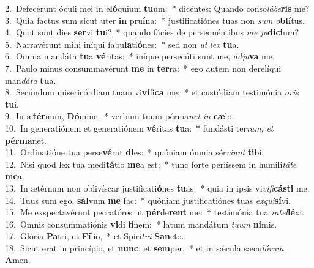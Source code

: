 {2.~}Defecérunt óculi mei in e\textbf{ló}quium \textbf{tu}um:~* dicéntes: Quando conso\textit{lá}\textit{be}\textbf{ris} me?\\
{3.~}Quia factus sum sicut uter \textbf{in} pru\textbf{í}na:~* justificatiónes tuas non \textit{sum} \textit{o}\textbf{blí}tus.\\
{4.~}Quot sunt dies \textbf{ser}vi \textbf{tu}i?~* quando fácies de persequéntibus \textit{me} \textit{ju}\textbf{dí}\textbf{ci}um?\\
{5.~}Narravérunt mihi iníqui fabu\textbf{la}ti\textbf{ó}nes:~* sed non \textit{ut} \textit{lex} \textbf{tu}a.\\
{6.~}Omnia mandáta \textbf{tu}a \textbf{vé}ritas:~* iníque persecúti sunt me, \textit{ád}\textit{ju}\textbf{va} me.\\
{7.~}Paulo minus consummavérunt \textbf{me} in \textbf{ter}ra:~* ego autem non derelíqui man\textit{dá}\textit{ta} \textbf{tu}a.\\
{8.~}Secúndum misericórdiam tuam vi\textbf{ví}fi\textbf{ca} me:~* et custódiam testimónia \textit{o}\textit{ris} \textbf{tu}i.\\
{9.~}In æ\textbf{tér}num, \textbf{Dó}mine,~* verbum tuum pérma\textit{net} \textit{in} \textbf{cæ}lo.\\
{10.~}In generatiónem et generatiónem \textbf{vé}ritas \textbf{tu}a:~* fundásti ter\textit{ram}, \textit{et} \textbf{pér}\textbf{ma}net.\\
{11.~}Ordinatióne tua perse\textbf{vé}rat \textbf{di}es:~* quóniam ómnia sér\textit{vi}\textit{unt} \textbf{ti}bi.\\
{12.~}Nisi quod lex tua medi\textbf{tá}tio \textbf{me}a est:~* tunc forte periíssem in humili\textit{tá}\textit{te} \textbf{me}a.\\
{13.~}In ætérnum non oblivíscar justificati\textbf{ó}nes \textbf{tu}as:~* quia in ipsis vi\textit{vi}\textit{fi}\textbf{cá}\textbf{sti} me.\\
{14.~}Tuus sum ego, \textbf{sal}vum \textbf{me} fac:~* quóniam justificatiónes tuas \textit{ex}\textit{qui}\textbf{sí}vi.\\
{15.~}Me exspectavérunt peccatóres ut \textbf{pér}de\textbf{rent} me:~* testimónia tua \textit{in}\textit{tel}\textbf{lé}xi.\\
{16.~}Omnis consummatiónis \textbf{vi}di \textbf{fi}nem:~* latum mandátum \textit{tu}\textit{um} \textbf{ni}mis.\\
{17.~}Glória \textbf{Pa}tri, et \textbf{Fí}lio,~* et Spirí\textit{tu}\textit{i} \textbf{San}cto.\\
{18.~}Sicut erat in princípio, et \textbf{nunc}, et \textbf{sem}per,~* et in sǽcula sæcu\textit{ló}\textit{rum}. \textbf{A}men.\\
